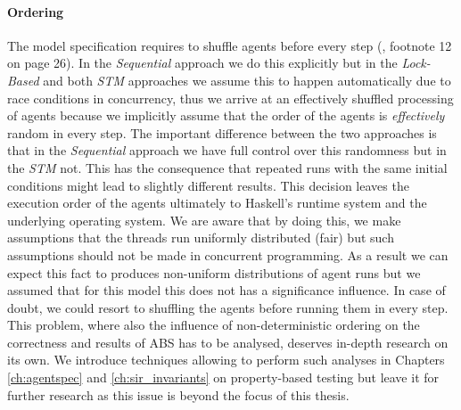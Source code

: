 \paragraph{Ordering} The model specification requires to shuffle agents before every step (\cite{epstein_growing_1996}, footnote 12 on page 26). In the \textit{Sequential} approach we do this explicitly but in the \textit{Lock-Based} and both \textit{STM} approaches we assume this to happen automatically due to race conditions in concurrency, thus we arrive at an effectively shuffled processing of agents because we implicitly assume that the order of the agents is \textit{effectively} random in every step. The important difference between the two approaches is that in the \textit{Sequential} approach we have full control over this randomness but in the \textit{STM} not. This has the consequence that repeated runs with the same initial conditions might lead to slightly different results. 
This decision leaves the execution order of the agents ultimately to Haskell's runtime system and the underlying operating system. We are aware that by doing this, we make assumptions that the threads run uniformly distributed (fair) but such assumptions should not be made in concurrent programming. As a result we can expect this fact to produces non-uniform distributions of agent runs but we assumed that for this model this does not has a significance influence. In case of doubt, we could resort to shuffling the agents before running them in every step. This problem, where also the influence of non-deterministic ordering on the correctness and results of ABS has to be analysed, deserves in-depth research on its own. We introduce techniques allowing to perform such analyses in Chapters \ref{ch:agentspec} and \ref{ch:sir_invariants} on property-based testing but leave it for further research as this issue is beyond the focus of this thesis.


